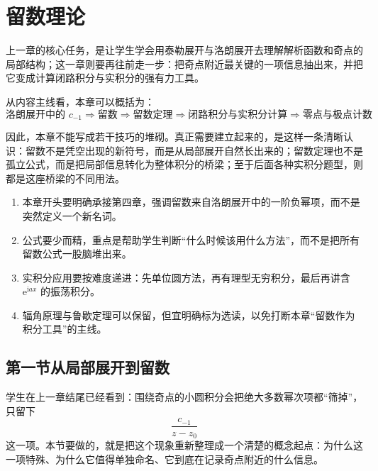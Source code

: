 
\chapter{留数理论}

\begin{wulibj}[本章定位]
上一章的核心任务，是让学生学会用泰勒展开与洛朗展开去理解解析函数和奇点的局部结构；这一章则要再往前走一步：把奇点附近最关键的一项信息抽出来，并把它变成计算闭路积分与实积分的强有力工具。

从内容主线看，本章可以概括为：
\[
    \text{洛朗展开中的 } c_{-1}
    \Longrightarrow
    \text{留数}
    \Longrightarrow
    \text{留数定理}
    \Longrightarrow
    \text{闭路积分与实积分计算}
    \Longrightarrow
    \text{零点与极点计数}
\]

因此，本章不能写成若干技巧的堆砌。真正需要建立起来的，是这样一条清晰认识：留数不是凭空出现的新符号，而是从局部展开自然长出来的；留数定理也不是孤立公式，而是把局部信息转化为整体积分的桥梁；至于后面各种实积分题型，则都是这座桥梁的不同用法。
\end{wulibj}

\begin{tishi}[写作总原则]
\begin{enumerate}
    \item 本章开头要明确承接第四章，强调留数来自洛朗展开中的一阶负幂项，而不是突然定义一个新名词。
    \item 公式要少而精，重点是帮助学生判断``什么时候该用什么方法''，而不是把所有留数公式一股脑堆出来。
    \item 实积分应用要按难度递进：先单位圆方法，再有理型无穷积分，最后再讲含 $\mathrm{e}^{\mathrm{i}ax}$ 的振荡积分。
    \item 辐角原理与鲁歇定理可以保留，但宜明确标为选读，以免打断本章``留数作为积分工具''的主线。
\end{enumerate}
\end{tishi}

\section{第一节\quad 从局部展开到留数}

\begin{wulibj}[本节要解决的问题]
学生在上一章结尾已经看到：围绕奇点的小圆积分会把绝大多数幂次项都``筛掉''，只留下
\[
    \frac{c_{-1}}{z-z_0}
\]
这一项。本节要做的，就是把这个现象重新整理成一个清楚的概念起点：为什么这一项特殊、为什么它值得单独命名、它到底在记录奇点附近的什么信息。
\end{wulibj}

